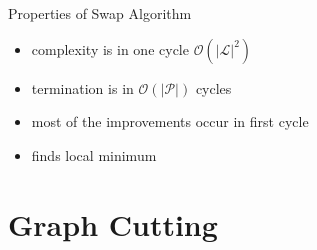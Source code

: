 \documentclass[mathserif]{beamer}
\def\secslide{
    \begin{frame}
        \centering \Huge \secname
    \end{frame}
    \addtocounter{framenumber}{-1}
}
\begin{document}
\begin{frame}{Properties of Swap Algorithm}
    \begin{itemize}
        \item complexity is in one cycle $\mathcal{O}(|\mathcal{L}|^2)$
        \item termination is in $\mathcal{O}(|\mathcal{P}|)$ cycles
        \item most of the improvements occur in first cycle
        \item finds local minimum
    \end{itemize}
\end{frame}

\section{Graph Cutting}
\secslide
\end{document}
